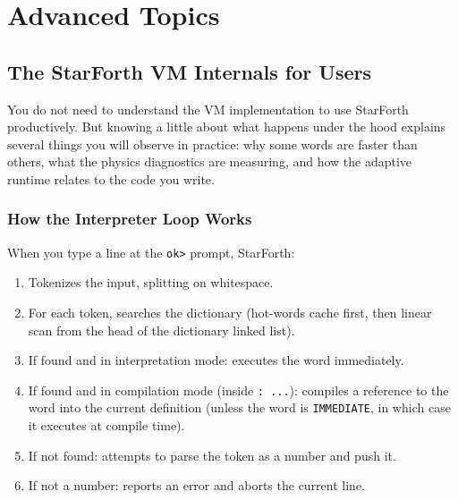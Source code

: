 
\part{Advanced Topics}

\chapter{The StarForth VM Internals for Users}
\label{chap:vm-internals}

You do not need to understand the VM implementation to use StarForth
productively. But knowing a little about what happens under the hood explains
several things you will observe in practice: why some words are faster than
others, what the physics diagnostics are measuring, and how the adaptive
runtime relates to the code you write.

\section{How the Interpreter Loop Works}
\label{sec:interp-loop}

When you type a line at the \texttt{ok>} prompt, StarForth:

\begin{enumerate}
  \item Tokenizes the input, splitting on whitespace.
  \item For each token, searches the dictionary (hot-words cache first, then
    linear scan from the head of the dictionary linked list).
  \item If found and in interpretation mode: executes the word immediately.
  \item If found and in compilation mode (inside \texttt{: ...}): compiles a
    reference to the word into the current definition (unless the word is
    \texttt{IMMEDIATE}, in which case it executes at compile time).
  \item If not found: attempts to parse the token as a number and push it.
  \item If not a number: reports an error and aborts the current line.
\end{enumerate}

